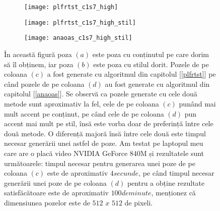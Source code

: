 \begin{figure}[h]
\begin{subfigure}[b]{0.24\textwidth}
		\centering
        \texttt{[image: plfrtst\_c1s7\_high]}
        \label{fig:plfrtst_c1s7_high}
        \caption{}
	\end{subfigure}
    \hfill
    \begin{subfigure}[b]{0.24\textwidth}
		\centering
        \texttt{[image: plfrtst\_c1s7\_high\_stil]}
        \label{fig:plfrtst_c1s7_high_stil}
        \caption{}
	\end{subfigure}
    \hfill
    \begin{subfigure}[b]{0.24\textwidth}
		\centering
        \texttt{[image: anaoas\_c1s7\_high\_stil]}
        \label{fig:anaoas_c1s7_high_stil}
        \caption{}
	\end{subfigure}
    \caption{În această figură poza $(a)$ este poza cu conținutul pe care dorim să îl obținem, iar poza $(b)$ este poza cu stilul dorit. Pozele de pe coloana $(c)$ a fost generate cu algoritmul din capitolul [\ref{plfrtst}] pe când pozele de pe coloana $(d)$ au fost generate cu algoritmul din capitolul [\ref{anaoas}]. Se observă ca pozele generate cu cele două metode sunt aproximativ la fel, cele de pe coloana $(c)$ punând mai mult accent pe conținut, pe când cele de pe coloana $(d)$ pun accent mai mult pe stil, însă este vorba doar de preferință între cele două metode. O diferență majoră însă între cele două este timpul necesar generării unei astfel de poze. Am testat pe laptopul meu care are o placă video NVIDIA GeForce 840M și rezultatele sunt următoarele: timpul necesar pentru generarea unei poze de pe coloana $(c)$ este de aproximativ $4 secunde$, pe când timpul necesar generării unei poze de pe coloana $(d)$ pentru a obține rezultate satisfăcătoare este de aproximativ $100 de minute$, menționez că dimensiunea pozelor este de $512$ $x$ $512$ de pixeli.}
\end{figure}